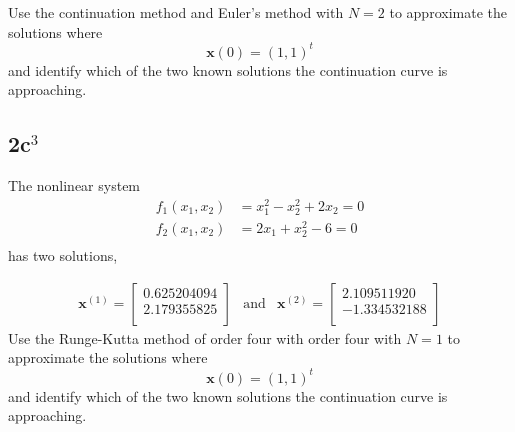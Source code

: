 \documentclass[12pt]{article}
\begin{document}
Use the continuation method and Euler's method with $N=2$ to
approximate the solutions where $$\mathbf{x}(0)=(1,1)^t$$ and identify
which of the two known solutions the continuation curve is
approaching.

\subsection{2c$^3$}
The nonlinear system
\begin{align*}
  f_1(x_1,x_2)&=x_1^2-x_2^2+2x_2 =0 \\
  f_2(x_1,x_2)&=2x_1+x_2^2-6 =0 \\
\end{align*}
has two solutions,

\begin{equation*}
  \begin{array}{ccc}
    \mathbf{x}^{(1)}=
    \begin{bmatrix}
      0.625204094 \\
      2.179355825 \\
    \end{bmatrix}
    &
    \mathrm{and}
    &
    \mathbf{x}^{(2)}=
    \begin{bmatrix}
      2.109511920 \\
      −1.334532188 \\
    \end{bmatrix}
  \end{array}
\end{equation*}
Use the Runge-Kutta method of order four with order four with $N=1$ to
approximate the solutions where $$\mathbf{x}(0)=(1,1)^t$$ and identify
which of the two known solutions the continuation curve is
approaching.
\end{document}
